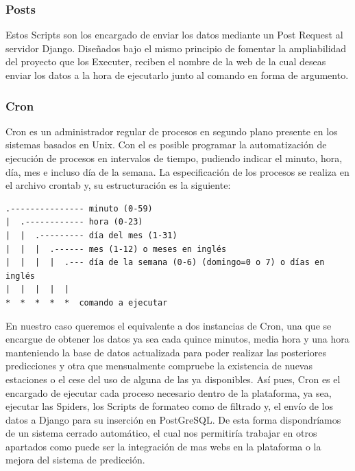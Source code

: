\subsubsection{Posts}
Estos Scripts son los encargado de enviar los datos mediante un Post Request al servidor Django.\newline
\newline
Diseñados bajo el mismo principio de fomentar la ampliabilidad del proyecto que los Executer, reciben el nombre de la web de la cual deseas enviar los datos a la hora de ejecutarlo junto al comando en forma de argumento.

\subsubsection{Cron}
Cron es un administrador regular de procesos en segundo plano presente en los sistemas basados en Unix. Con el es posible programar la automatización de ejecución de procesos en intervalos de tiempo, pudiendo indicar el minuto, hora, día, mes e incluso día de la semana.\newline
\newline
La especificación de los procesos se realiza en el archivo crontab y, su estructuración es la siguiente:

\begin{verbatim}
.--------------- minuto (0-59) 
|  .------------ hora (0-23)
|  |  .--------- día del mes (1-31)
|  |  |  .------ mes (1-12) o meses en inglés
|  |  |  |  .--- día de la semana (0-6) (domingo=0 o 7) o días en inglés 
|  |  |  |  |
*  *  *  *  *  comando a ejecutar
\end{verbatim}

En nuestro caso queremos el equivalente a dos instancias de Cron, una que se encargue de obtener los datos ya sea cada quince minutos, media hora y una hora manteniendo la base de datos actualizada para poder realizar las posteriores predicciones y otra que mensualmente compruebe la existencia de nuevas estaciones o el cese del uso de alguna de las ya disponibles.\newline
\newline
Así pues, Cron es el encargado de ejecutar cada proceso necesario dentro de la plataforma, ya sea, ejecutar las Spiders, los Scripts de formateo como de filtrado y, el envío de los datos a Django para su inserción en PostGreSQL.\newline
\newline
De esta forma dispondríamos de un sistema cerrado automático, el cual nos permitiría trabajar en otros apartados como puede ser la integración de mas webs en la plataforma o la mejora del sistema de predicción.

